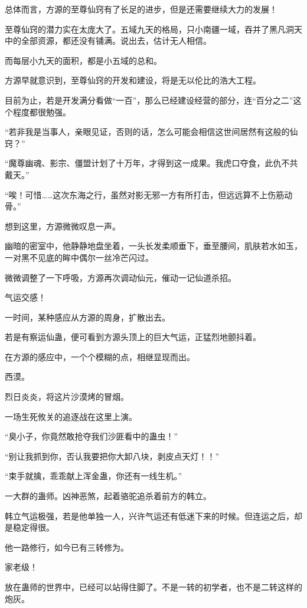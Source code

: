 
\begin{this_body}

总体而言，方源的至尊仙窍有了长足的进步，但是还需要继续大力的发展！

至尊仙窍的潜力实在太庞大了。五域九天的格局，只小南疆一域，吞并了黑凡洞天中的全部资源，都还没有铺满。说出去，估计无人相信。

而每层小九天的面积，都是小五域的总和。

方源早就意识到，至尊仙窍的开发和建设，将是无以伦比的浩大工程。

目前为止，若是开发满分看做“一百”，那么已经建设经营的部分，连“百分之二”这个程度都很勉强。

“若非我是当事人，亲眼见证，否则的话，怎么可能会相信这世间居然有这般的仙窍？”

“魔尊幽魂、影宗、僵盟计划了十万年，才得到这一成果。我虎口夺食，此仇不共戴天。”

“唉！可惜……这次东海之行，虽然对影无邪一方有所打击，但远远算不上伤筋动骨。”

想到这里，方源微微叹息一声。

幽暗的密室中，他静静地盘坐着，一头长发柔顺垂下，垂至腰间，肌肤若水如玉，一对黑不见底的眸中偶尔一丝冷芒闪过。

微微调整了一下呼吸，方源再次调动仙元，催动一记仙道杀招。

气运交感！

一时间，某种感应从方源的周身，扩散出去。

若是有察运仙蛊，便可看到方源头顶上的巨大气运，正猛烈地颤抖着。

在方源的感应中，一个个模糊的点，相继显现而出。

西漠。

烈日炎炎，将这片沙漠烤的冒烟。

一场生死攸关的追逐战在这里上演。

“臭小子，你竟然敢抢夺我们沙匪看中的蛊虫！”

“别让我抓到你，否认我要把你大卸八块，剥皮点天灯！！”

“束手就擒，乖乖献上浑金蛊，你还有一线生机。”

一大群的蛊师。凶神恶煞，起着骆驼追杀着前方的韩立。

韩立气运极强，若是他单独一人，兴许气运还有低迷下来的时候。但连运之后，却是稳定得很。

他一路修行，如今已有三转修为。

家老级！

放在蛊师的世界中，已经可以站得住脚了。不是一转的初学者，也不是二转这样的炮灰。


\end{this_body}
